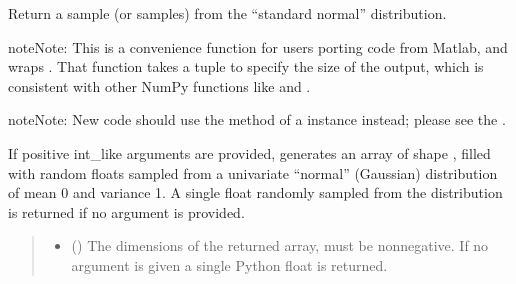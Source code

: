 \documentclass[letterpaper,10pt,english]{sphinxmanual}
\begin{document}
\begin{fulllineitems}
\label{\detokenize{metilda.controllers:metilda.controllers.pitch_art_wizard.randn}}
\pysigstartsignatures
{}
\pysigstopsignatures
\sphinxAtStartPar
Return a sample (or samples) from the “standard normal” distribution.

\begin{sphinxadmonition}{note}{Note:}
\sphinxAtStartPar
This is a convenience function for users porting code from Matlab,
and wraps . That function takes a
tuple to specify the size of the output, which is consistent with
other NumPy functions like  and .
\end{sphinxadmonition}

\begin{sphinxadmonition}{note}{Note:}
\sphinxAtStartPar
New code should use the
method of a  instance instead;
please see the .
\end{sphinxadmonition}

\sphinxAtStartPar
If positive int\_like arguments are provided,  generates an array
of shape , filled
with random floats sampled from a univariate “normal” (Gaussian)
distribution of mean 0 and variance 1. A single float randomly sampled
from the distribution is returned if no argument is provided.
\begin{quote}\begin{description}
\begin{itemize}
\item {} 
\sphinxAtStartPar
{} (\sphinxstyleliteralemphasis{\sphinxupquote{, }}) \textendash{} The dimensions of the returned array, must be non\sphinxhyphen{}negative.
If no argument is given a single Python float is returned.


\end{itemize}
\end{description}
\end{quote}
\end{fulllineitems}
\end{document}

